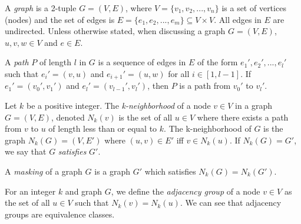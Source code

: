 \begin{dfn}
A \emph{graph} is a 2-tuple $G = (V,E)$, where $V = \{v_1,v_2,...,v_n\}$ is a set of vertices (nodes) and the set of edges is $E = \{e_1,e_2,...,e_m\} \subseteq V \times V$. All edges in $E$ are undirected. Unless otherwise stated, when discussing a graph $G=(V,E)$, $u,v,w \in V$ and $e \in E$. 
\end{dfn}

\begin{dfn}
 A \emph{path} $P$ of length $l$ in $G$ is a sequence of edges in $E$ of the form $e_1', e_2', ...,e_l'$ such that $e_i' = (v,u)$ and $e_{i+1}' = (u,w)$ for all $i \in [1,l-1]$. If $e_1' = (v_0', v_1')$ and $e_l' = (v_{l-1}', v_l')$, then $P$ is a path from $v_0'$ to $v_l'$. 
\end{dfn}

\begin{dfn}
Let $k$ be a positive integer. The \emph{k-neighborhood} of a node $v \in V$ in a graph $G = (V,E)$, denoted $N_k(v)$ is the set of all $u \in V$ where there exists a path from $v$ to $u$ of length less than or equal to $k$. The k-neighborhood of $G$ is the graph $N_k(G) = (V, E')$ where $(u,v) \in E'$ iff $v \in N_k(u)$. If $N_k(G) = G'$, we say that $G$ \emph{satisfies} $G'$. 
\end{dfn}

\begin{dfn}
A \emph{masking} of a graph $G$ is a graph $G'$ which satisfies $N_k(G) = N_k(G')$.\\
\end{dfn}

\begin{dfn}
For an integer $k$ and graph $G$, we define the \emph{adjacency group} of a node $v \in V$ as the set of all $u \in V$ such that $N_k(v) = N_k(u)$. We can see that adjacency groups are equivalence classes.
\end{dfn}
